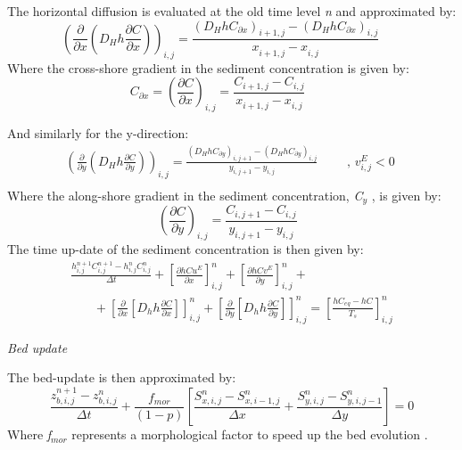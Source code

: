 \eject The horizontal diffusion is evaluated at the old time level \textit{n} and approximated by:
\begin{equation} \label{2.24)} 
\left(\frac{\partial }{\partial x} \left(D_{H} h\frac{\partial C}{\partial x} \right)\right)_{i,j} =\frac{\left(D_{H} hC_{\partial x} \right)_{i+1,j} -\left(D_{H} hC_{\partial x} \right)_{i,j} }{x_{i+1,j}^{} -x_{i,j}^{} } \, \, \, \, \, \, \, \, \, \, \,  
\end{equation} 
Where the cross-shore gradient in the sediment concentration is given by:
\begin{equation} \label{2.25)} 
C_{\partial x} =\left(\frac{\partial C}{\partial x} \right)_{i,j} =\frac{C_{i+1,j} -C_{i,j} }{x_{i+1,j}^{} -x_{i,j}^{} } \, \, \, \, \, \, \, \, \, \, \, \, \;  
\end{equation} 


And similarly for the y-direction:
\begin{equation} \label{2.26)} 
\begin{array}{l} {\left(\frac{\partial }{\partial y} \left(D_{H} h\frac{\partial C}{\partial y} \right)\right)_{i,j} =\frac{\left(D_{H} hC_{\partial y} \right)_{i,j+1} -\left(D_{H} hC_{\partial y} \right)_{i,j} }{y_{i,j+1}^{} -y_{i,j}^{} } \, \, \, \, \, \, \, \, \, \, \, \, \, \, ,\, v_{i,j}^{E} <0\; } \\ {} \end{array} 
\end{equation} 
Where the along-shore gradient in the sediment concentration, \textit{C${}_{y}$} , is given by:
\begin{equation} \label{2.27)} 
\left(\frac{\partial C}{\partial y} \right)_{i,j} =\frac{C_{i,j+1} -C_{i,j} }{y_{i,j+1}^{} -y_{i,j}^{} } \, \, \, \,  
\end{equation} 
The time up-date of the sediment concentration is then given by:
\begin{equation} \label{2.28)} 
\begin{array}{l} {\frac{h_{i,j}^{n+1} C_{i,j}^{n+1} -h_{i,j}^{n} C_{i,j}^{n} }{\Delta t} +\left[\frac{\partial hCu^{E} }{\partial x} \right]_{i,j}^{n} +\left[\frac{\partial hCv^{E} }{\partial y} \right]_{i,j}^{n} +} \\ {\, \, \, \, \, \, \, \, \, \, \, +\left[\frac{\partial }{\partial x} \left[D_{h} h\frac{\partial C}{\partial x} \right]\right]_{i,j}^{n} +\left[\frac{\partial }{\partial y} \left[D_{h} h\frac{\partial C}{\partial y} \right]\right]_{i,j}^{n} =\left[\frac{hC_{eq} -hC}{T_{s} } \right]_{i,j}^{n} } \end{array} 
\end{equation} 

{\it  Bed update}

The bed-update is then approximated by:
\begin{equation} \label{2.29)} 
\frac{z_{b,i,j}^{n+1} -z_{b,i,j}^{n} }{\Delta t} +\frac{f_{mor} }{(1-p)} \left[\frac{S_{x,i,j}^{n} -S_{x,i-1,j}^{n} }{\Delta x} +\frac{S_{y,i,j}^{n} -S_{y,i,j-1}^{n} }{\Delta y} \right]=0 
\end{equation} 
Where \textit{f${}_{mor}$} represents a morphological factor to speed up the bed evolution \citep[see e.g.][]{Roelvink2006}.

